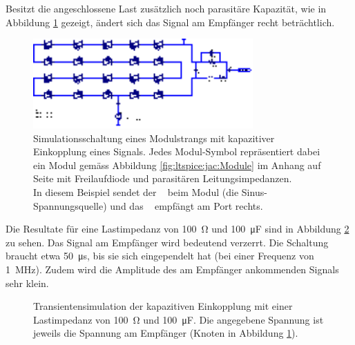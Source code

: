 Besitzt die  angeschlossene Last  zus\"atzlich noch  parasit\"are Kapazit\"at, wie
in Abbildung \ref{fig:ltspice:capacitive:string:Cload} gezeigt, \"andert sich das
Signal am Empf\"anger recht betr\"achtlich.

\begin{figure}[h!tb]
    \centering
    \includegraphics[width=0.75\textwidth]{images/ltspice/jac/capacitive-Cload.eps}
    \caption{%
        Simulationsschaltung  eines Modulstrangs  mit kapazitiver  Einkopplung
        eines  Signals. Jedes  Modul-Symbol  repr\"asentiert dabei  ein  Modul
        gem\"ass  Abbildung \ref{fig:ltspice:jac:Module}  im Anhang  auf Seite
        \pageref{fig:ltspice:jac:Module}  mit Freilaufdiode  und parasit\"aren
        Leitungsimpedanzen.\protect\\
        In   diesem   Beispiel   sendet   der   \Sensor~   beim   Modul   (die
        Sinus-Spannungsquelle)   und   das   \Master~   empf\"angt   am   Port
         rechts.%
    }
    \label{fig:ltspice:capacitive:string:Cload}
\end{figure}

Die    Resultate   f\"ur    eine   Lastimpedanz    von   \SI{100}{\ohm}    und
\SI{100}{\micro\farad} sind  in Abbildung \ref{fig:simu:capacitive:tran:Cload}
zu sehen. Das  Signal am Empf\"anger  wird bedeutend verzerrt.   Die Schaltung
braucht etwa \SI{50}{\micro\second}, bis sie  sich eingependelt hat (bei einer
Frequenz von \SI{1}{\mega\hertz}). Zudem wird die Amplitude des am Empf\"anger
ankommenden Signals sehr klein.

\begin{figure}[h!tb]
    
    \caption{%
        Transientensimulation   der   kapazitiven    Einkopplung   mit   einer
        Lastimpedanz    von    \SI{100}{\ohm}   und    \SI{100}{\micro\farad}.
        Die     angegebene    Spannung     ist     jeweils    die     Spannung
        am     Empf\"anger    (Knoten         in     Abbildung
        \ref{fig:ltspice:capacitive:string:Cload}).%
    }
    \label{fig:simu:capacitive:tran:Cload}
\end{figure}


